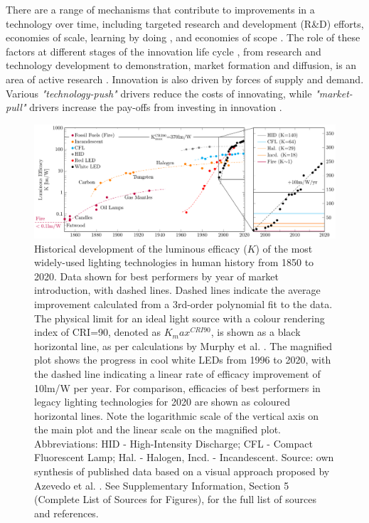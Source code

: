 \documentclass[twoside,twocolumn,9pt]{article}
\begin{document}
There are a range of mechanisms that contribute to improvements in a technology over time, including targeted research and development (R\&D) efforts, economies of scale, learning by doing \cite{Arrow1971}, and economies of scope \cite{johansson2012global}\cite{national2016power}\cite{iea2020perspectives}. The role of these factors at different stages of the innovation life cycle \cite{ grubler2012policies}, from research and technology development to demonstration, market formation and diffusion, is an area of active research \cite{Mowery1979} \cite{kavlak2018evaluating} \cite{Ziegler2021}. Innovation is also driven by forces of supply and demand. Various \textit{"technology-push"} drivers reduce the costs of innovating, while \textit{"market-pull"} drivers increase the pay-offs from investing in innovation \cite{anadon2009policy}.

\begin{figure}[h]
 \centering
 \includegraphics[width=\textwidth]{2_SSL_EES/article/figures/history_efficacy.pdf}
 \caption{Historical development of the luminous efficacy ($K$) of the most widely-used lighting technologies in human history from 1850 to 2020. Data shown for best performers by year of market introduction, with dashed lines. Dashed lines indicate the average improvement calculated from a 3rd-order polynomial fit to the data. The physical limit for an ideal light source with a colour rendering index of CRI=90, denoted as $K_max^{CRI90}$, is shown as a black horizontal line, as per calculations by Murphy et al. \cite{Murphy2012}. The magnified plot shows the progress in cool white LEDs from 1996 to 2020, with the dashed line indicating a linear rate of efficacy improvement of 10lm/W per year. For comparison, efficacies of best performers in legacy lighting technologies for 2020 are shown as coloured horizontal lines. Note the logarithmic scale of the vertical axis on the main plot and the linear scale on the magnified plot. Abbreviations: HID - High-Intensity Discharge; CFL - Compact Fluorescent Lamp; Hal. - Halogen, Incd. - Incandescent. Source: own synthesis of published data based on a visual approach proposed by Azevedo et al. \cite{azevedo2009transition}. See Supplementary Information, Section 5 (Complete List of Sources for Figures), for the full list of sources and references.}
 \label{fgr:history_efficacy}
\end{figure}
 
\end{document}
